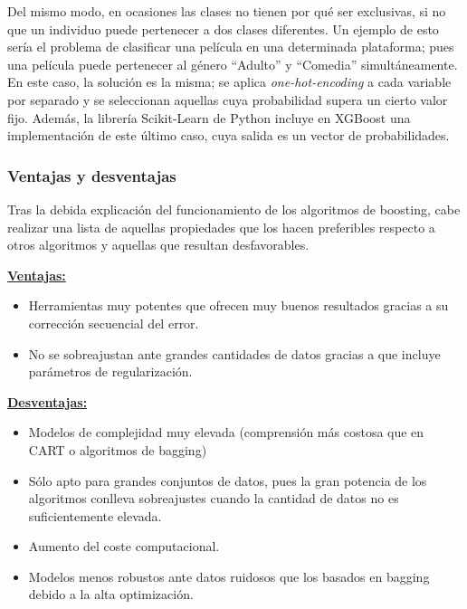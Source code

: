 \documentclass[12pt,twoside]{article}
\begin{document}
Del mismo modo, en ocasiones las clases no tienen por qué ser exclusivas, si no que un individuo puede pertenecer a dos clases diferentes. Un ejemplo de esto sería el problema de clasificar una película en una determinada plataforma; pues una película puede pertenecer al género ``Adulto'' y ``Comedia'' simultáneamente. En este caso, la solución es la misma; se aplica \textit{one-hot-encoding} a cada variable por separado y se seleccionan aquellas cuya probabilidad supera un cierto valor fijo. Además, la librería Scikit-Learn de Python incluye en XGBoost una implementación de este último caso, cuya salida es un vector de probabilidades. 







\subsubsection{Ventajas y desventajas}

Tras la debida explicación del funcionamiento de los algoritmos de boosting, cabe realizar una lista de aquellas propiedades que los hacen preferibles respecto a otros algoritmos y aquellas que resultan desfavorables.

\textbf{\underline{Ventajas:}}
\begin{itemize}
\item Herramientas muy potentes que ofrecen muy buenos resultados gracias a su corrección secuencial del error.

\item No se sobreajustan ante grandes cantidades de datos gracias a que incluye parámetros de regularización.
\end{itemize}

\textbf{\underline{Desventajas:}}
\begin{itemize}
\item Modelos de complejidad muy elevada (comprensión más costosa que en CART o algoritmos de bagging)

\item Sólo apto para grandes conjuntos de datos, pues la gran potencia de los algoritmos conlleva sobreajustes cuando la cantidad de datos no es suficientemente elevada.

\item Aumento del coste computacional.

\item Modelos menos robustos ante datos ruidosos que los basados en bagging debido a la alta optimización.
\end{itemize}
\end{document}
